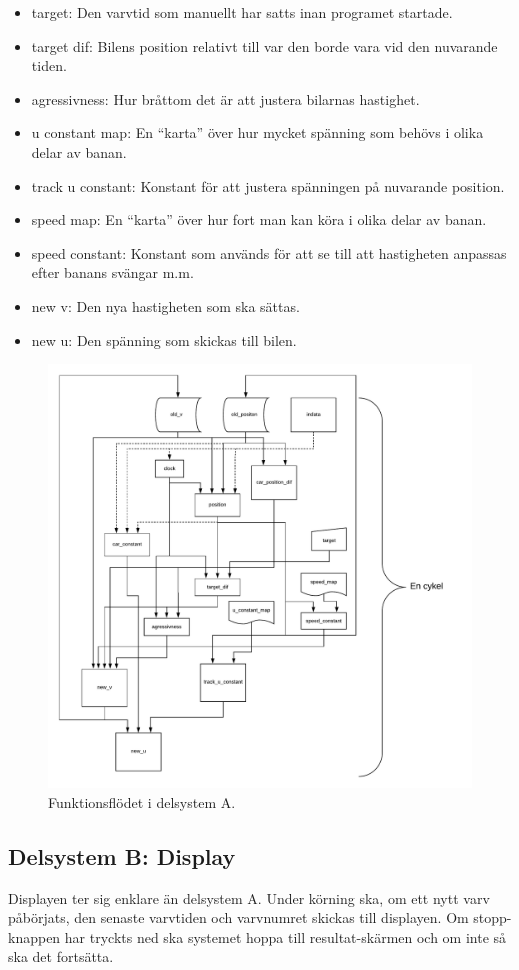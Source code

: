\begin{itemize}
      \item target: Den varvtid som manuellt har satts inan programet startade.
      \item target dif: Bilens position relativt till var den borde vara vid den nuvarande tiden.
      \item agressivness: Hur bråttom det är att justera bilarnas hastighet.
      \item u constant map: En ``karta'' över hur mycket spänning som behövs i olika delar av banan.
      \item track u constant: Konstant för att justera spänningen på nuvarande position.
      \item speed map: En ``karta'' över hur fort man kan köra i olika delar av banan.
      \item speed constant: Konstant som används för att se till att hastigheten anpassas efter banans svängar m.m.
      \item new v: Den nya hastigheten som ska sättas.
      \item new u: Den spänning som skickas till bilen.
    \end{itemize}

    \begin{figure}
      \centering
      \includegraphics[width=\linewidth]{figures/flow.pdf}
      \caption{Funktionsflödet i delsystem A.}%
      \label{fig:flow_diagram}
    \end{figure}

  \subsection{Delsystem B: Display}

  Displayen ter sig enklare än delsystem A. Under körning ska, om ett nytt varv
  påbörjats, den senaste varvtiden och varvnumret skickas till displayen. Om
  stopp-knappen har tryckts ned ska systemet hoppa till resultat-skärmen och om
  inte så ska det fortsätta.

